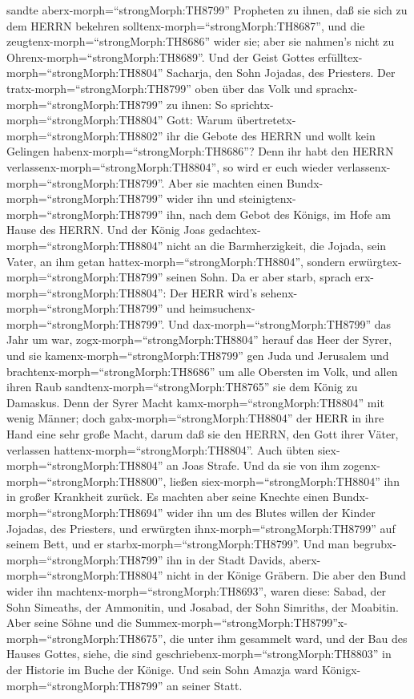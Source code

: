 sandte aberx-morph=``strongMorph:TH8799'' Propheten zu ihnen, daß sie
sich zu dem HERRN bekehren solltenx-morph=``strongMorph:TH8687'', und
die zeugtenx-morph=``strongMorph:TH8686'' wider sie; aber sie nahmen's
nicht zu Ohrenx-morph=``strongMorph:TH8689''.  Und der
Geist Gottes erfülltex-morph=``strongMorph:TH8804'' Sacharja, den Sohn
Jojadas, des Priesters. Der tratx-morph=``strongMorph:TH8799'' oben über
das Volk und sprachx-morph=``strongMorph:TH8799'' zu ihnen: So
sprichtx-morph=``strongMorph:TH8804'' Gott: Warum
übertretetx-morph=``strongMorph:TH8802'' ihr die Gebote des HERRN und
wollt kein Gelingen habenx-morph=``strongMorph:TH8686''? Denn ihr habt
den HERRN verlassenx-morph=``strongMorph:TH8804'', so wird er euch
wieder verlassenx-morph=``strongMorph:TH8799''.  Aber sie
machten einen Bundx-morph=``strongMorph:TH8799'' wider ihn und
steinigtenx-morph=``strongMorph:TH8799'' ihn, nach dem Gebot des Königs,
im Hofe am Hause des HERRN.  Und der König Joas
gedachtex-morph=``strongMorph:TH8804'' nicht an die Barmherzigkeit, die
Jojada, sein Vater, an ihm getan hattex-morph=``strongMorph:TH8804'',
sondern erwürgtex-morph=``strongMorph:TH8799'' seinen Sohn. Da er aber
starb, sprach erx-morph=``strongMorph:TH8804'': Der HERR wird's
sehenx-morph=``strongMorph:TH8799'' und
heimsuchenx-morph=``strongMorph:TH8799''.  Und
dax-morph=``strongMorph:TH8799'' das Jahr um war,
zogx-morph=``strongMorph:TH8804'' herauf das Heer der Syrer, und sie
kamenx-morph=``strongMorph:TH8799'' gen Juda und Jerusalem und
brachtenx-morph=``strongMorph:TH8686'' um alle Obersten im Volk, und
allen ihren Raub sandtenx-morph=``strongMorph:TH8765'' sie dem König zu
Damaskus.  Denn der Syrer Macht
kamx-morph=``strongMorph:TH8804'' mit wenig Männer; doch
gabx-morph=``strongMorph:TH8804'' der HERR in ihre Hand eine sehr große
Macht, darum daß sie den HERRN, den Gott ihrer Väter, verlassen
hattenx-morph=``strongMorph:TH8804''. Auch übten
siex-morph=``strongMorph:TH8804'' an Joas Strafe.  Und da
sie von ihm zogenx-morph=``strongMorph:TH8800'', ließen
siex-morph=``strongMorph:TH8804'' ihn in großer Krankheit zurück. Es
machten aber seine Knechte einen Bundx-morph=``strongMorph:TH8694''
wider ihn um des Blutes willen der Kinder Jojadas, des Priesters, und
erwürgten ihnx-morph=``strongMorph:TH8799'' auf seinem Bett, und er
starbx-morph=``strongMorph:TH8799''. Und man
begrubx-morph=``strongMorph:TH8799'' ihn in der Stadt Davids,
aberx-morph=``strongMorph:TH8804'' nicht in der Könige Gräbern.
 Die aber den Bund wider ihn
machtenx-morph=``strongMorph:TH8693'', waren diese: Sabad, der Sohn
Simeaths, der Ammonitin, und Josabad, der Sohn Simriths, der Moabitin.
 Aber seine Söhne und die
Summex-morph=``strongMorph:TH8799''\textbar x-morph=``strongMorph:TH8675'',
die unter ihm gesammelt ward, und der Bau des Hauses Gottes, siehe, die
sind geschriebenx-morph=``strongMorph:TH8803'' in der Historie im Buche
der Könige. Und sein Sohn Amazja ward
Königx-morph=``strongMorph:TH8799'' an seiner Statt.

